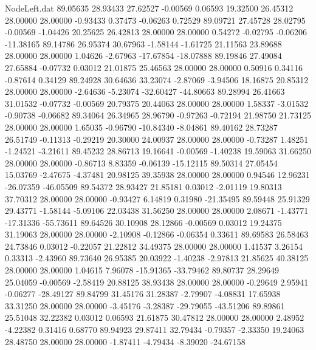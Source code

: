 \begin{filecontents}{NodeLeft.dat}
  89.05635   28.93433   27.62527    -0.00569    0.06593   19.32500   26.45312   28.00000   28.00000   -0.93433    0.37473   -0.06263    0.72529
  89.09721   27.45728   28.02795    -0.00569   -1.04426   20.25625   26.42813   28.00000   28.00000    0.54272   -0.02795   -0.06206  -11.38165
  89.14786   26.95374   30.67963    -1.58144   -1.61725   21.11563   23.89688   28.00000   28.00000    1.04626   -2.67963  -17.67854  -18.07888
  89.19846   27.49084   27.65884    -0.07732    0.03012   21.01875   25.46563   28.00000   28.00000    0.50916    0.34116   -0.87614    0.34129
  89.24928   30.64636   33.23074    -2.87069   -3.94506   18.16875   20.85312   28.00000   28.00000   -2.64636   -5.23074  -32.60427  -44.80663
  89.28994   26.41663   31.01532    -0.07732   -0.00569   20.79375   20.44063   28.00000   28.00000    1.58337   -3.01532   -0.90738   -0.06682
  89.34064   26.34965   28.96790    -0.97263   -0.72194   21.98750   21.73125   28.00000   28.00000    1.65035   -0.96790  -10.84340   -8.04861
  89.40162   28.73287   26.51749    -0.11313   -0.29219   20.30000   24.00937   28.00000   28.00000   -0.73287    1.48251   -1.24521   -3.21611
  89.45232   28.86713   19.16641    -0.00569   -1.40238   19.59063   31.66250   28.00000   28.00000   -0.86713    8.83359   -0.06139  -15.12115
  89.50314   27.05454   15.03769    -2.47675   -4.37481   20.98125   39.35938   28.00000   28.00000    0.94546   12.96231  -26.07359  -46.05509
  89.54372   28.93427   21.85181     0.03012   -2.01119   19.80313   37.70312   28.00000   28.00000   -0.93427    6.14819    0.31980  -21.35495
  89.59448   25.91329   29.43771    -1.58144   -5.09106   22.03438   31.56250   28.00000   28.00000    2.08671   -1.43771  -17.31336  -55.73611
  89.64526   30.10908   28.12866    -0.00569    0.03012   19.24375   31.19063   28.00000   28.00000   -2.10908   -0.12866   -0.06354    0.33611
  89.69583   26.58463   24.73846     0.03012   -0.22057   21.22812   34.49375   28.00000   28.00000    1.41537    3.26154    0.33313   -2.43960
  89.73640   26.95385   20.03922    -1.40238   -2.97813   21.85625   40.38125   28.00000   28.00000    1.04615    7.96078  -15.91365  -33.79462
  89.80737   28.29649   25.04059    -0.00569   -2.58419   20.88125   38.93438   28.00000   28.00000   -0.29649    2.95941   -0.06277  -28.49127
  89.84799   31.45176   31.28387    -2.79907   -4.08831   17.65938   33.31250   28.00000   28.00000   -3.45176   -3.28387  -29.79055  -43.51206
  89.89861   25.51048   32.22382     0.03012    0.06593   21.61875   30.47812   28.00000   28.00000    2.48952   -4.22382    0.31416    0.68770
  89.94923   29.87411   32.79434    -0.79357   -2.33350   19.24063   28.48750   28.00000   28.00000   -1.87411   -4.79434   -8.39020  -24.67158

\end{filecontents}
